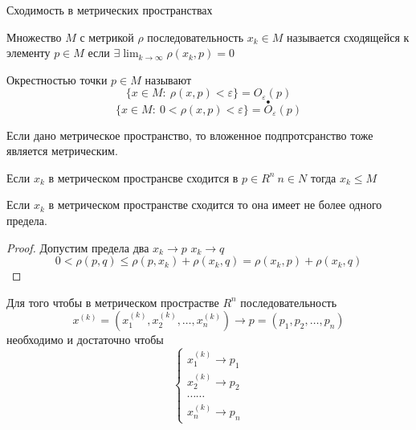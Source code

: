 \begin{title}[\Large]
  Сходимость в метрических пространствах
\end{title}

\begin{define}
  Множество $M$ с метрикой $\rho$ последовательность $x_k \in M$ называется
  сходящейся к элементу $p \in M$ если $\exists \lim_{k \to \infty} \rho(x_k, p)
  = 0$
\end{define}

\begin{define}
  Окрестностью точки $p \in M$ называют
  $$
  \{ x \in M: ~ \rho(x, p) < \varepsilon \} = O_{\varepsilon}(p)
  $$
  $$
  \{ x \in M: ~ 0 < \rho(x, p) < \varepsilon \} =
  \stackrel{\bullet}{O}_{\varepsilon}(p)
  $$
\end{define}

\begin{block}[Свойство]
  Если дано метрическое пространство, то вложенное подпротсранство тоже
  является метрическим.
\end{block}

\begin{theorem}
  Если $x_k$ в метрическом пространсве сходится в $p \in R^n ~ n \in N$ тогда
  $x_k \le M$
\end{theorem}

\begin{theorem}
  Если $x_k$ в метрическом пространстве сходится то она имеет не более одного
  предела.
\end{theorem}

\begin{proof}
  Допустим предела два $x_k \to p$ $x_k \to q$
  $$
  0 < \rho(p, q) \le \rho(p, x_k) + \rho(x_k, q) = \rho(x_k, p) + \rho(x_k, q)
  $$
\end{proof}

\begin{block}
  Для того чтобы в метрическом прострастве $R^n$ последовательность
  $$
  x^{(k)} = (x_1^{(k)}, x_2^{(k)}, \ldots, x_n^{(k)}) \to
  p = (p_1, p_2, \ldots, p_n)
  $$
  необходимо и достаточно чтобы
  $$
  \left\{
  \begin{array}{c}
    x_1^{(k)} \to p_1 \\
    x_2^{(k)} \to p_2 \\
    \cdots \cdots \\
    x_n^{(k)} \to p_n
  \end{array}
  \right.
  $$
\end{block}

